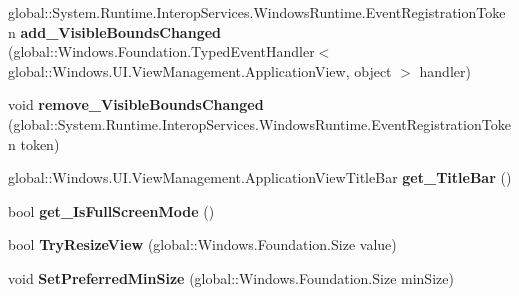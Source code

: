 \begin{DoxyCompactItemize}
\item 
\mbox{\label{class_windows_1_1_u_i_1_1_view_management_1_1_application_view_a1a4e9c3942d4eb2602fdeb123ed6f77a}} 
global\+::\+System.\+Runtime.\+Interop\+Services.\+Windows\+Runtime.\+Event\+Registration\+Token {\bfseries add\+\_\+\+Visible\+Bounds\+Changed} (global\+::\+Windows.\+Foundation.\+Typed\+Event\+Handler$<$ global\+::\+Windows.\+U\+I.\+View\+Management.\+Application\+View, object $>$ handler)
\item 
\mbox{\label{class_windows_1_1_u_i_1_1_view_management_1_1_application_view_a3c9197225cd620a40c58179a49da3349}} 
void {\bfseries remove\+\_\+\+Visible\+Bounds\+Changed} (global\+::\+System.\+Runtime.\+Interop\+Services.\+Windows\+Runtime.\+Event\+Registration\+Token token)
\item 
\mbox{\label{class_windows_1_1_u_i_1_1_view_management_1_1_application_view_ab9b05a73da58fd42c06c39c87d3292d8}} 
global\+::\+Windows.\+U\+I.\+View\+Management.\+Application\+View\+Title\+Bar {\bfseries get\+\_\+\+Title\+Bar} ()
\item 
\mbox{\label{class_windows_1_1_u_i_1_1_view_management_1_1_application_view_afde1936ca2f8aded16b77720619151e5}} 
bool {\bfseries get\+\_\+\+Is\+Full\+Screen\+Mode} ()
\item 
\mbox{\label{class_windows_1_1_u_i_1_1_view_management_1_1_application_view_a239abe45572bb1478737b90836a4b386}} 
bool {\bfseries Try\+Resize\+View} (global\+::\+Windows.\+Foundation.\+Size value)
\item 
\mbox{\label{class_windows_1_1_u_i_1_1_view_management_1_1_application_view_a0578db6c17fe182700dc8c5cb8973a14}} 
void {\bfseries Set\+Preferred\+Min\+Size} (global\+::\+Windows.\+Foundation.\+Size min\+Size)
\item 
\mbox{\label{class_windows_1_1_u_i_1_1_view_management_1_1_application_view_a10e1e2089e594fe33f2e591fc465535c}} 

\end{DoxyCompactItemize}
